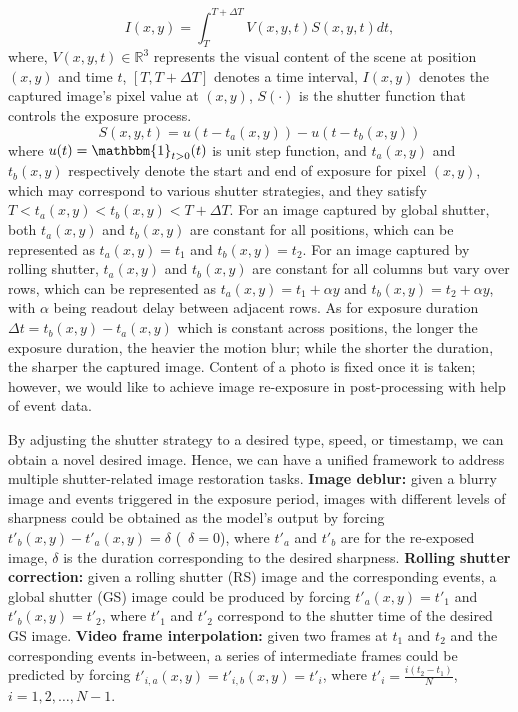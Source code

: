\documentclass[10pt,twocolumn,letterpaper]{article}
\begin{document}
\begin{equation}
I(x, y) = \int_{T}^{T+\Delta{T}} V(x,y,t)S(x,y,t) dt,
\label{equ:shutter_operation}
\end{equation}
where, $V(x,y,t) \in \mathbb{R}^3$ represents the visual content of the scene at position $(x, y)$ and time $t$, $[T, T+\Delta{T}]$ denotes a time interval, $I(x, y)$ denotes the captured image's pixel value at $(x,y)$, $S(\cdot)$ is the shutter function that controls the exposure process. 
\begin{equation}
S(x,y,t) = u(t-t_a(x,y)) - u(t-t_b(x,y)) 
\end{equation}
where $u(t)=\mathbbm{1}_{t>0}(t)$ is unit step function, and $t_a(x,y)$ and $t_b(x,y)$ respectively denote the start and end of exposure for pixel $(x,y)$, which may correspond to various shutter strategies, and they satisfy $T < t_a(x,y) < t_b(x,y) < T + \Delta{T}$.
For an image captured by global shutter, both $t_a(x,y)$ and $t_b(x,y)$ are constant for all positions, which can be represented as $t_a(x,y) = t_1$ and $t_b(x,y) = t_2$.
For an image captured by rolling shutter, 
$t_a(x,y)$ and $t_b(x,y)$ are constant for all columns but vary over rows, which can be represented as $t_a(x,y) = t_1 + \alpha y$ 
and $t_b(x,y) = t_2 + \alpha y$,
with 
$\alpha$ being readout delay between adjacent rows.
As for exposure duration $\Delta{t} = t_b(x,y) - t_a(x,y)$ which is constant across positions, the longer the exposure duration, the heavier the motion blur; while the shorter the duration, the sharper the captured image.
Content of a photo is fixed once it is taken; however, we would like to achieve image re-exposure in post-processing with help of event data.

By adjusting the shutter strategy to a desired type, speed, or timestamp, we can obtain a novel desired image.
Hence, we can have a unified framework to address multiple shutter-related image restoration tasks.
{\flushleft\textbf{Image deblur:}} given a blurry image and events triggered in the exposure period, images with different levels of sharpness could be obtained as the model's output by forcing 
$t'_b(x,y) - t'_a(x,y) = \delta$ (\eg ~$\delta = 0$), 
where $t'_a$ and $t'_b$ are for the re-exposed image, $\delta$ is the duration corresponding to the desired sharpness.
{\flushleft\textbf{Rolling shutter correction:}} given a rolling shutter (RS) image and the corresponding events, a global shutter (GS) image could be produced by forcing $t'_a(x,y) = t'_1$ and $t'_b(x,y) = t'_2$, where $t'_1$ and $t'_2$ correspond to the shutter time of the desired GS image.
{\flushleft\textbf{Video frame interpolation:}} given two frames at $t_1$ and $t_2$ and the corresponding events in-between, a series of intermediate frames could be predicted by forcing  $t'_{i,a}(x,y)=t'_{i,b}(x,y)=t'_i$, where $t'_i = \frac{i(t_2 - t_1)}{N}$, $i = 1, 2, \dots, N-1$.
\end{document}
